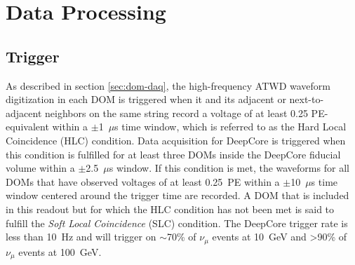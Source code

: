 \section{Data Processing}
\label{sec:data-processing}

\subsection{Trigger}
As described in section \ref{sec:dom-daq}, the high-frequency ATWD waveform digitization in each DOM is triggered when it and its adjacent or next-to-adjacent neighbors on the same string record a voltage of at least 0.25 PE-equivalent within a $\pm$1~$\mu$s time window, which is referred to as the Hard Local Coincidence (HLC) condition. Data acquisition for DeepCore is triggered when this condition is fulfilled for at least three DOMs inside the DeepCore fiducial volume within a $\pm$2.5~$\mu$s window. If this condition is met, the waveforms for all DOMs that have observed voltages of at least 0.25~PE within a $\pm$10~$\mu$s time window centered around the trigger time are recorded. A DOM that is included in this readout but for which the HLC condition has not been met is said to fulfill the \emph{Soft Local Coincidence} (SLC) condition. The DeepCore trigger rate is less than 10~Hz and will trigger on $\sim$70\% of $\nu_\mu$ events at 10~GeV and >90\% of $\nu_\mu$ events at 100~GeV\cite{DeepCore}.

